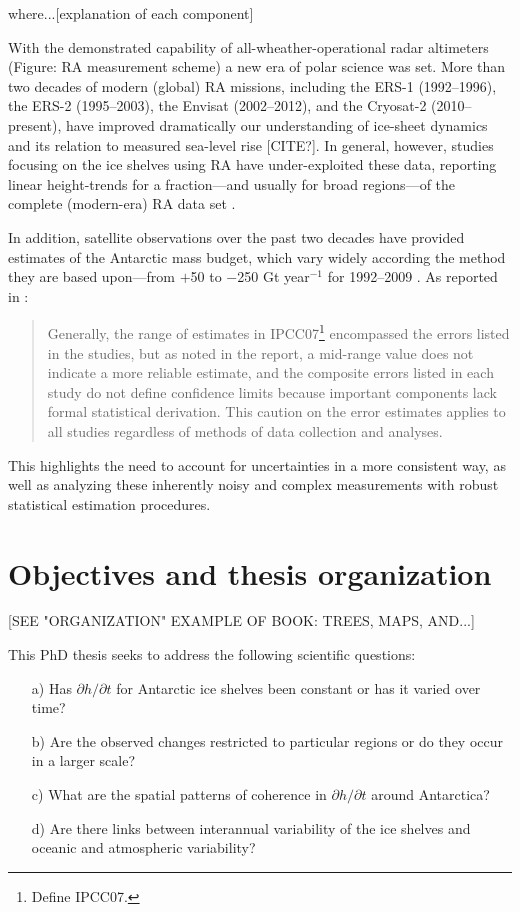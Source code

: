 where...[explanation of each component]

With the demonstrated capability of all-wheather-operational radar altimeters
(Figure: RA measurement scheme)
a new era of polar science was set. More than two decades of modern (global) RA missions,
including the ERS-1 (1992--1996), the ERS-2 (1995--2003), the Envisat (2002--2012), and
the Cryosat-2 (2010--present), have improved dramatically our understanding of ice-sheet
dynamics and its relation to measured sea-level rise [CITE?]. In general, however,
studies focusing on the ice shelves using RA have under-exploited these data,
reporting linear height-trends for a fraction---and usually for broad regions---of the complete (modern-era) RA data set \parencite{Shepherd2003, Shepherd2010, Zwally2005}.

In addition, satellite observations over the past two decades have provided estimates of
the Antarctic mass budget, which vary widely according the method they are based upon---from
$+$50 to $-$250 Gt year$^{-1}$ for 1992--2009 \parencite{Zwally2011}. As reported in
\textcite{Zwally2011}:

\begin{quotation}
\noindent
Generally, the range of estimates in IPCC07\footnote{Define IPCC07.} encompassed the errors listed in the studies, but as noted in the report, a mid-range value does not indicate a more reliable estimate, and the composite errors listed in each study do not define confidence limits because important components lack formal statistical derivation. This caution on the error estimates applies to all studies regardless of methods of data collection and analyses.
\end{quotation}

This highlights the need to account for uncertainties in a more consistent way, as well as analyzing these inherently noisy and complex measurements with robust statistical estimation procedures.

\section*{Objectives and thesis organization}

[SEE "ORGANIZATION" EXAMPLE OF BOOK: TREES, MAPS, AND...]

This PhD thesis seeks to address the following scientific questions:

\begin{enumerate}
  \item[a)] Has $\partial h / \partial t$ for Antarctic ice shelves been constant
  or has it varied over time?
  \item[b)] Are the observed changes restricted to particular regions or do they
  occur in a larger scale?
  \item[c)] What are the spatial patterns of coherence in $\partial h / \partial t$
  around Antarctica?
  \item[d)] Are there links between interannual variability of the ice shelves and
  oceanic and atmospheric variability?
\end{enumerate}

